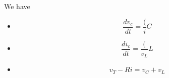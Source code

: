 \documentclass[preview]{standalone}
\begin{document}
\begin{center}
\raggedright
                We have 
                \begin{itemize}
                  \item \[ \frac{dv_c}{dt} = \frac({i}{C} \]
                  \item \[ \frac{di_c}{dt} = \frac({v_L}{L} \]
                  \item \[ v_T - Ri = v_C + v_L\]
                \end{itemize}
\end{center}
\end{document}
